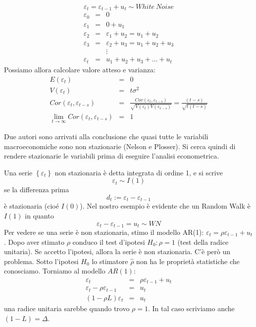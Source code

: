 \documentclass[a4paper]{report}
\newcounter{ese}
\theoremstyle{remark}
\begin{document}
\begin{equation*}
\varepsilon _{t}=\varepsilon _{t-1}+u_{t}\sim White\ Noise
\end{equation*}%
\begin{eqnarray*}
\varepsilon _{0} &=&0 \\
\varepsilon _{1} &=&0+u_{1} \\
\varepsilon _{2} &=&\varepsilon _{1}+u_{2}=u_{1}+u_{2} \\
\varepsilon _{3} &=&\varepsilon _{2}+u_{3}=u_{1}+u_{2}+u_{3} \\
&&\vdots \\
\varepsilon _{t} &=&u_{1}+u_{2}+u_{3}+\ldots +u_{t}
\end{eqnarray*}%
Possiamo allora calcolare valore atteso e varianza:%
\begin{eqnarray*}
E(\varepsilon _{t}) &=&0 \\
V(\varepsilon _{t}) &=&t\sigma ^{2} \\
Cor(\varepsilon _{t},\varepsilon _{t-s}) &=&\frac{Cov(\varepsilon
_{t},\varepsilon _{t-s})}{\sqrt{V(\varepsilon _{t})V(\varepsilon _{t-s})}}=%
\frac{(t-s)}{\sqrt{t(t-s)}} \\
\lim_{t\rightarrow \infty }Cor(\varepsilon _{t},\varepsilon _{t-s}) &=&1
\end{eqnarray*}

\noindent Due autori sono arrivati alla conclusione che quasi tutte le
variabili macroeconomiche sono non stazionarie (Nelson e Plosser). Si cerca
quindi di rendere stazionarie le variabili prima di eseguire l'analisi
econometrica.

\noindent Una serie $\left\{ \varepsilon _{t}\right\} $ non stazionaria \`{e}
detta integrata di ordine 1, e si scrive%
\begin{equation*}
\varepsilon _{t}\sim I(1)
\end{equation*}%
se la differenza prima 
\begin{equation*}
d_{t}:=\varepsilon _{t}-\varepsilon _{t-1}
\end{equation*}%
\`{e} stazionaria (cio\'{e} $I(0)$). Nel nostro esempio \`{e} evidente che
un Random Walk \`{e} $I(1)$ in quanto 
\begin{equation*}
\varepsilon _{t}-\varepsilon _{t-1}=u_{t}\sim WN
\end{equation*}%
Per vedere se una serie \`{e} non stazionaria, stimo il modello AR(1): $%
\varepsilon _{t}=\rho \varepsilon _{t-1}+u_{t}$. Dopo aver stimato $\rho $
conduco il test d'ipotesi $H_{0}:\rho =1$ (test della radice unitaria). Se
accetto l'ipotesi, allora la serie \`{e} non stazionaria. C'\`{e} per\`{o}
un problema. Sotto l'ipotesi $H_{0}$ lo stimatore $\widehat{\rho }$ non ha
le propriet\`{a} statistiche che conosciamo. Torniamo al modello $AR(1)$: 
\begin{eqnarray*}
\varepsilon _{t} &=&\rho \varepsilon _{t-1}+u_{t} \\
\varepsilon _{t}-\rho \varepsilon _{t-1} &=&u_{t} \\
(1-\rho L)\varepsilon _{t} &=&u_{t}
\end{eqnarray*}%
una radice unitaria sarebbe quando trovo $\rho =1$. In tal caso scriviamo
anche $(1-L)=\Delta $.
\end{document}
